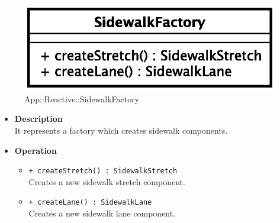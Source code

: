 \begin{figure}[h]
\centering
\includegraphics[scale=0.6,keepaspectratio]{images/solution/sidewalk_factory.eps}
\caption{App::Reactive::SidewalkFactory}
\label{fig:sd-app-sidewalk-factory}
\end{figure}
\FloatBarrier
\begin{itemize}
  \item \textbf{Description} \\
It represents a factory which creates sidewalk components.
  \item \textbf{Operation} \\
  \begin{itemize} 
    \item \texttt{+ createStretch() : SidewalkStretch} \\
Creates a new sidewalk stretch component.
    \item \texttt{+ createLane() : SidewalkLane} \\
Creates a new sidewalk lane component.
  \end{itemize}
\end{itemize}
